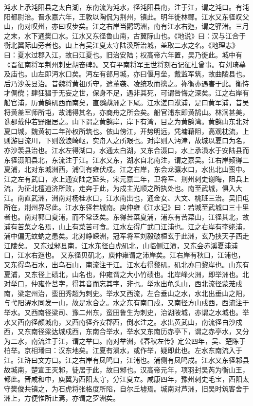 \documentclass[12pt,UTF8]{ctexbook}
\begin{document}
沌水上承沌阳县之太白湖，东南流为沌水，径沌阳县南，注于江，谓之沌口。有沌阳都尉治。晋永嘉六年，王敦以陶侃为荆州，镇此。明年徙林鄣。江水又东径叹父山，南对叹州，亦曰叹步矣。江之右岸当鹦鹉洲，南有江水右迤，谓之驿渚。三月之末，水下通樊口水。江水又东径鲁山南，古翼际山也。《地说》曰：汉与江合于衡北翼际山旁者也。山上有吴江夏太守陆涣所治城，盖取二水之名。《地理志》曰：夏水过郡入江，故曰江夏也。旧治安陆；权高帝六年置，吴乃徙此。城中有《晋征南将军荆州刺史胡奋碑》。又有平南将军王世将刻石记征杜曾事。有刘琦墓及庙也。山左即沔水口矣。沔左有郤月城，亦曰偃月垒，戴监军筑，故曲陵县也。后乃沙羡县治。昔魏将黄祖所守，遣董袭、凌统攻而擒之。祢衡亦遇害于此。衡恃才倜傥；肆狂猖于无妄之世，保身不足，遇非其死，可谓咎悔之深矣。江之右岸有船官浦，历黄鹄矶西而南矣，直鹦鹉洲之下尾。江水溠曰洑浦，是曰黄军浦，昔吴将黄盖军师所屯，故浦得其名，亦商舟之所会矣。船官浦东即黄鹄山。林涧甚美，谯郡戴仲若野服居之。山下谓之黄鹄岸，岸下有湾，目之为黄鹄湾。黄鹄山东北对夏口城，魏黄初二年孙权所筑也。依山傍江，开势明远，凭墉藉阻，高观枕流，上则游目流川，下则激浪崎岖，实舟人之所艰也。对岸则人沔津，故城以夏口为名，亦沙羡县治也。江水左得湖口，水通太白湖，又东合滠口，水上承溳水于安陆县而东径滠阳县北，东流注于江。江水又东，湖水自北南注，谓之嘉吴。江右岸频得二夏浦，北对东城洲西，浦侧有雍伏戍。江之右岸，东会龙骧水口，水出北山蛮中。江之左有武口，水上通安陆之延头，宋元嘉二年，卫将军、荆州刺史谢晦，阻兵上流，为征北檀道济所败，走奔于此，为戍主光顺之所执处也。南至武城，俱入大江。南直武洲，洲南对杨桂水口，江水南出也，通金女、大文、桃班三治。吴旧屯所在，荆州界尽此。江水东径若城南。庾仲雍《江水记》曰：若城至武城口三十里者也。南对郭口夏浦，而不常泛矣。东得苦菜夏浦，浦东有苦菜山，江径其北，故浦有苦菜之名焉，山上有菜苦可食。江水左得广武口江浦也。江之右岸有李姥浦，浦中偏无蚊蚋之患矣。北对峥嵘洲，冠军将军刘毅破桓玄于此洲，玄乃挟天子西走江陵矣。
又东过邾县南，江水东径白虎矶北，山临侧江濆，又东会赤溪夏浦浦口，江水右迤也。
又东径贝矶北，庾仲雍谓之沛岸矣。江右岸有秋口，江浦也，又东得鸟石水，出乌石山，南流注于江。江水右得黎矶，矶北亦曰黎岸也。山东有夏浦，又东径上碛北，山名也，仲雍谓之大小竹碛也。北岸峰火洲，即举洲也。北对举口，仲雍作莒字，得其音而忘其字，非也。举水出龟头山，西北流径蒙茏戍南，梁定州治，蛮田秀超为刺史。举水又西流，左合垂山之水，水北出垂山之阳，与弋阳淠水同发一山，故是水合之。水之东有南口戍，又南径方山戍西，西流注于举水。又西南径梁司、豫二州东，蛮田鲁生为刺史，治湖陂城，亦谓之水城也。举水又西南径颜城南，又西南径齐安郡西，倒水注之。水出黄武山，南流径白沙戍西，又东南径梁达城戍西，东南合举水，举水又东南历赤亭下，谓之赤亭水，又分为二水，南流注于江，谓之举口。南对举洲，《春秋左传》定公四年，吴、楚陈于柏举。京相璠曰：汉东地矣。江夏有溳水，或作举，疑即此也。左水东南流入于江。江浒曰文方口。江之右岸有凤鸣口，江浦也。浦侧有凤鸣戍。江水又东径邾县故城南，楚宣王灭邾，徒居于此，故曰邾也。汉高帝元年，项羽封吴芮为衡山王，都此。晋咸和中，庾翼为西阳太守，分江夏立。咸康四年，豫州刺史毛宝，西阳太守樊俊共镇之，为石虎将张格度所陷，自尔丘墟焉。城南对芦洲，旧吴时筑客舍于洲上，方便惟所止焉，亦谓之罗洲矣。
\end{document}
